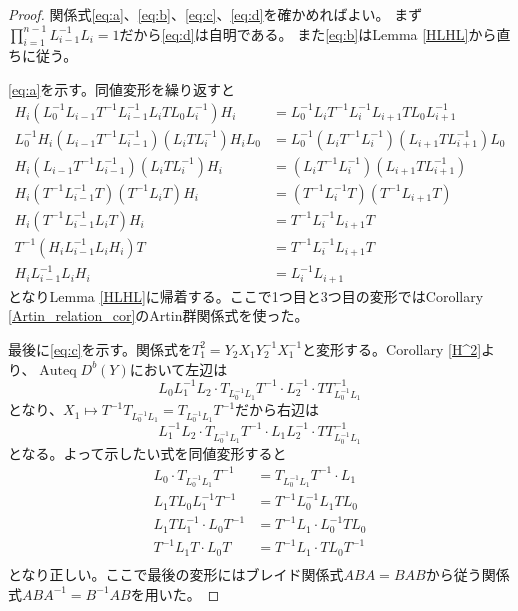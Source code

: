 \documentclass[uplatex, a4paper, dvipdfmx]{jsarticle}
\theoremstyle{definition}
\DeclareMathOperator{\Auteq}{\mathrm{Auteq}}
\begin{document}
\begin{proof}
    関係式\eqref{eq:a}、\eqref{eq:b}、\eqref{eq:c}、\eqref{eq:d}を確かめればよい。
    まず$\prod_{i=1}^{n-1} L_{i-1}^{-1}L_i = 1$だから\eqref{eq:d}は自明である。
    また\eqref{eq:b}はLemma \ref{HLHL}から直ちに従う。

    \eqref{eq:a}を示す。同値変形を繰り返すと
    \begin{align}
        H_i(L_0^{-1}L_{i-1}T^{-1}L_{i-1}^{-1}L_iTL_0L_i^{-1})H_i   & = L_0^{-1}L_{i}T^{-1}L_{i}^{-1}L_{i+1}TL_0L_{i+1}^{-1}     \\
        L_0^{-1}H_i(L_{i-1}T^{-1}L_{i-1}^{-1})(L_iTL_i^{-1})H_iL_0 & = L_0^{-1}(L_{i}T^{-1}L_{i}^{-1})(L_{i+1}TL_{i+1}^{-1})L_0 \\
        H_i(L_{i-1}T^{-1}L_{i-1}^{-1})(L_iTL_i^{-1})H_i            & = (L_{i}T^{-1}L_{i}^{-1})(L_{i+1}TL_{i+1}^{-1})            \\
        H_i(T^{-1}L_{i-1}^{-1}T)(T^{-1}L_iT)H_i                    & = (T^{-1}L_{i}^{-1}T)(T^{-1}L_{i+1}T)                      \\
        H_i(T^{-1}L_{i-1}^{-1}L_iT)H_i                             & = T^{-1}L_{i}^{-1}L_{i+1}T                                 \\
        T^{-1}(H_iL_{i-1}^{-1}L_iH_i)T                             & = T^{-1}L_{i}^{-1}L_{i+1}T                                 \\
        H_iL_{i-1}^{-1}L_iH_i                                      & =L_{i}^{-1}L_{i+1}
    \end{align}
    となりLemma \ref{HLHL}に帰着する。ここで1つ目と3つ目の変形ではCorollary \ref{Artin_relation_cor}のArtin群関係式を使った。

    最後に\eqref{eq:c}を示す。関係式を$T_1^2 = Y_2X_1Y_2^{-1}X_1^{-1}$と変形する。Corollary \ref{H^2}より、$\Auteq D^b(Y)$において左辺は
    \begin{equation}
        L_0L_1^{-1}L_2 \cdot T_{L_0^{-1}L_1}T^{-1}\cdot L_2^{-1} \cdot T T_{L_0^{-1}L_1}^{-1}
    \end{equation}
    となり、$X_1 \mapsto T^{-1}T_{L_0^{-1}L_1} = T_{L_0^{-1}L_1}T^{-1}$だから右辺は
    \begin{equation}
        L_1^{-1}L_2 \cdot T_{L_0^{-1}L_1}T^{-1} \cdot L_1L_2^{-1} \cdot T T_{L_0^{-1}L_1}^{-1}
    \end{equation}
    となる。よって示したい式を同値変形すると
    \begin{align}
        L_0 \cdot T_{L_0^{-1}L_1}T^{-1} & = T_{L_0^{-1}L_1}T^{-1} \cdot L_1 \\
        L_1TL_0L_1^{-1}T^{-1}           & = T^{-1}L_0^{-1}L_1TL_0           \\
        L_1TL_1^{-1}\cdot L_0T^{-1}     & = T^{-1}L_1 \cdot L_0^{-1}TL_0    \\
        T^{-1}L_1T\cdot L_0T            & = T^{-1}L_1 \cdot TL_0T^{-1}      \\
    \end{align}
    となり正しい。ここで最後の変形にはブレイド関係式$ABA = BAB$から従う関係式$ABA^{-1}=B^{-1}AB$を用いた。
\end{proof}


\printbibliography[title=参考文献]
\end{document}
